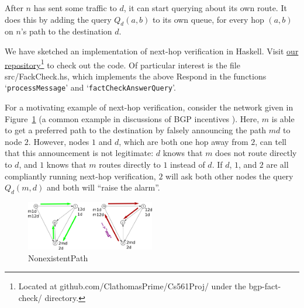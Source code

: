 \documentclass[pdftex,twoside,twocolumn,10pt,letterpaper]{article}
\begin{document}
  After $n$ has sent some traffic to $d$, it can start querying about its own
  route. It does this by adding the query $Q_d(a,b)$ to its own queue,
  for every hop $(a,b)$ on $n$'s path to the destination $d$.

  We have sketched an implementation of next-hop verification in Haskell.
  Visit
  \href{https://github.com/ClathomasPrime/Cs561Proj/tree/master/bgp-fact-check/}
  {our repository}\footnote{
    Located at github.com/ClathomasPrime/Cs561Proj/
    under the bgp-fact-check/ directory.
  }
  to check out the code.
  Of particular interest is the file src/FackCheck.hs, which implements the
  above {\sc Respond} in the functions `\texttt{processMessage}' and
  `\texttt{factCheckAnswerQuery}'.

  For a motivating example of next-hop verification, consider the
  network given in Figure~\ref{fig:Nonexistent} (a common example in discussions
  of BGP incentives \cite{RoutingGames, Attraction}).
  Here, $m$ is able to get a preferred path to the destination by falsely
  announcing the path $md$ to node $2$.
  However, nodes $1$ and $d$, which are both one hop away from $2$,
  can tell that this announcement is not legitimate:
  $d$ knows that $m$ does not route directly to $d$,
  and $1$ knows that $m$ routes directly to $1$ instead of $d$.
  If $d$, $1$, and $2$ are all compliantly running next-hop verification,
  $2$ will ask both other nodes the query $Q_d(m,d)$ and both
  will ``raise the alarm''.

  \begin{figure}[h]
    \centering
    \caption{NonexistentPath}\label{fig:Nonexistent}
    \includegraphics[width=0.5\textwidth]{NonexistentBetter}
  \end{figure}
\end{document}
